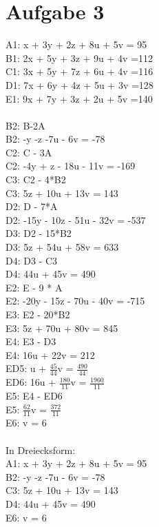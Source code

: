 \documentclass{article}
\begin{document}
	\section*{Aufgabe 3}
	A1: x + 3y + 2z + 8u + 5v = 95 \\
	B1: 2x + 5y + 3z + 9u + 4v =112 \\
	C1: 3x + 5y + 7z + 6u + 4v =116 \\
	D1: 7x + 6y + 4z + 5u + 3v =128 \\
	E1: 9x + 7y + 3z + 2u + 5v =140 \\ \\
	B2: B-2A \\
	B2: -y  -z  -7u  - 6v = -78 \\
	C2: C - 3A \\
	C2: -4y + z - 18u - 11v = -169 \\
	C3: C2 - 4*B2 \\
	C3:  5z + 10u + 13v = 143 \\
	D2: D - 7*A \\
	D2: -15y - 10z - 51u - 32v = -537 \\
	D3: D2 - 15*B2 \\
	D3: 5z + 54u + 58v = 633 \\
	D4: D3 - C3 \\
	D4: 44u + 45v = 490\\
	E2: E - 9 * A \\
	E2: -20y - 15z - 70u - 40v = -715 \\
	E3: E2 - 20*B2 \\
	E3: 5z + 70u + 80v = 845 \\ 
	E4: E3 - D3 \\
	E4: 16u + 22v = 212 \\
	ED5: u + $\frac{45}{44}$v = $\frac{490}{44}$ \\
	ED6: 16u + $\frac{180}{11}$v = $\frac{1960}{11}$ \\
	E5: E4 - ED6 \\
	E5: $\frac{62}{11}$v = $\frac{372}{11}$ \\
	E6: v = 6 \\ \\
	In Dreiecksform: \\
	A1: x + 3y + 2z + 8u + 5v = 95 \\
	B2: -y  -z  -7u  - 6v = -78 \\
	C3:  5z + 10u + 13v = 143 \\
	D4: 44u + 45v = 490\\
	E6: v = 6 \\ \\
\end{document}
